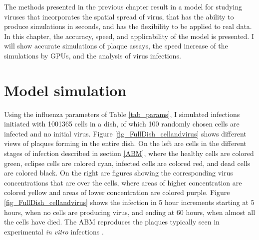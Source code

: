 
The methods presented in the previous chapter result in a model for studying viruses that incorporates the spatial spread of virus, that has the ability to produce simulations in seconds, and has the flexibility to be applied to real data. In this chapter, the accuracy, speed, and applicability of the model is presented. I will show accurate simulations of plaque assays, the speed increase of the simulations by GPUs, and the analysis of virus infections.

\section{Model simulation}

Using the influenza parameters of Table \ref{tab_params}, I simulated infections initiated with 1001365 cells in a dish, of which 100 randomly chosen cells are infected and no initial virus. Figure \ref{fig_FullDish_cellandvirus} shows different views of plaques forming in the entire dish. On the left are cells in the different stages of infection described in section \ref{ABM}, where the healthy cells are colored green, eclipse cells are colored cyan, infected cells are colored red, and dead cells are colored black. On the right are figures showing the corresponding virus concentrations that are over the cells, where areas of higher concentration are colored yellow and areas of lower concentration are colored purple. Figure \ref{fig_FullDish_cellandvirus} shows the infection in 5 hour increments starting at 5 hours, when no cells are producing virus, and ending at 60 hours, when almost all the cells have died. The ABM reproduces the plaques typically seen in experimental \emph{in vitro} infections \citep{holder11H274Y}. 

